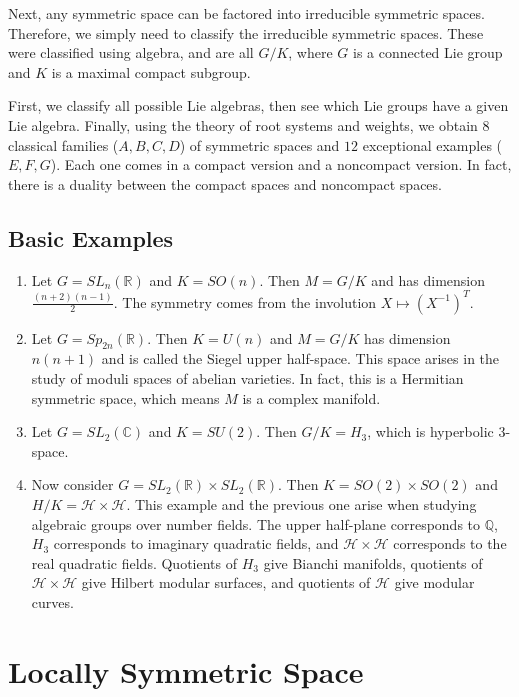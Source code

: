 \documentclass[leqno, openany]{memoir}
\theoremstyle{definition}
\theoremstyle{remark}
\theoremstyle{plain}
\theoremstyle{definition}
\theoremstyle{remark}
\newcommand{\R}{\mathbb{R}}
\renewcommand{\C}{\mathbb{C}}
\newcommand{\Q}{\mathbb{Q}}
\newcommand{\mc}[1]{\mathcal{#1}}
\begin{document}
Next, any symmetric space can be factored into irreducible symmetric spaces. Therefore, we simply need to classify the irreducible symmetric spaces. These were classified using algebra, and are all $G/K$, where $G$ is a connected Lie group and $K$ is a maximal compact subgroup.

First, we classify all possible Lie algebras, then see which Lie groups have a given Lie algebra. Finally, using the theory of root systems and weights, we obtain $8$ classical families ($A,B,C,D$) of symmetric spaces and $12$ exceptional examples ($E,F,G$). Each one comes in a compact version and a noncompact version. In fact, there is a duality between the compact spaces and noncompact spaces.

\subsection{Basic Examples}%
\label{sub:basic_examples}

\begin{enumerate}
    \item Let $G = SL_n(\R)$ and $K = SO(n)$. Then $M = G/K$ and has dimension $\frac{(n+2)(n-1)}{2}$. The symmetry comes from the involution $X \mapsto (X^{-1})^T$.
    \item Let $G = Sp_{2n}(\R)$. Then $K = U(n)$ and $M = G/K$ has dimension $n(n+1)$ and is called the Siegel upper half-space. This space arises in the study of moduli spaces of abelian varieties. In fact, this is a Hermitian symmetric space, which means $M$ is a complex manifold.
    \item Let $G = SL_2(\C)$ and $K = SU(2)$. Then $G/K = H_3$, which is hyperbolic $3$-space.
    \item Now consider $G = SL_2(\R) \times SL_2(\R)$. Then $K = SO(2) \times SO(2)$ and $H/K = \mc{H} \times \mc{H}$. This example and the previous one arise when studying algebraic groups over number fields. The upper half-plane corresponds to $\Q$, $H_3$ corresponds to imaginary quadratic fields, and $\mc{H} \times \mc{H}$ corresponds to the real quadratic fields. Quotients of $H_3$ give Bianchi manifolds, quotients of $\mc{H} \times \mc{H}$ give Hilbert modular surfaces, and quotients of $\mc{H}$ give modular curves.
\end{enumerate}

\section{Locally Symmetric Space}%
\label{sec:locally_symmetric_space}
\end{document}
